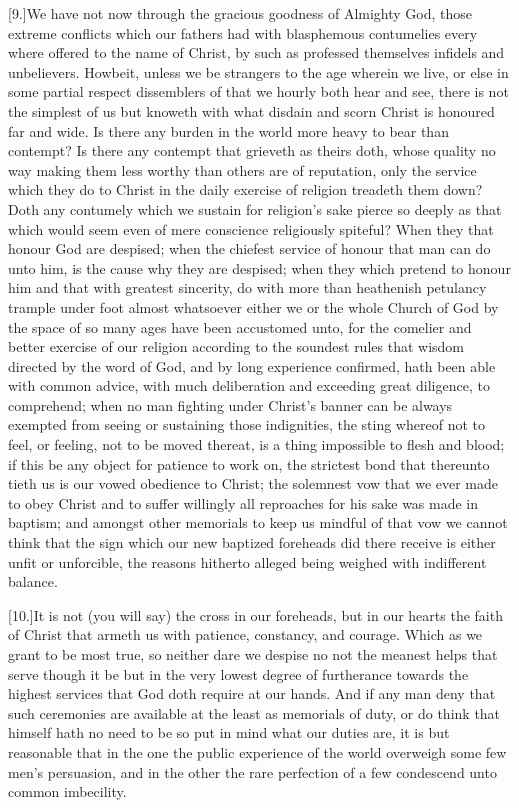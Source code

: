 [9.]We have not now through the gracious goodness of Almighty God, those extreme conflicts which our fathers had with blasphemous contumelies every where offered to the name of Christ, by such as professed themselves infidels and unbelievers. Howbeit, unless we be strangers to the age wherein we live, or else in some partial respect dissemblers  of that we hourly both hear and see, there is not the simplest of us but knoweth with what disdain and scorn Christ is honoured far and wide.
 Is there any burden in the world more heavy to bear than contempt? Is there any contempt that grieveth as theirs doth, whose quality no way making them less worthy than others are of reputation, only the service which they do to Christ in the daily exercise of religion treadeth them down? Doth any contumely which we sustain for religion’s sake pierce so deeply as that which would seem even of mere conscience religiously spiteful? When they that honour God are despised; when the chiefest service of honour that man can do unto him, is the cause why they are despised; when they which pretend to honour him and that with greatest sincerity, do with more than heathenish petulancy trample under foot almost whatsoever either we or the whole Church of God by the space of so many ages have been accustomed unto, for the comelier and better exercise of our religion according to the soundest rules that wisdom directed by the word of God, and by long experience confirmed, hath been able with common advice, with much deliberation and exceeding great diligence, to comprehend; when no man fighting under Christ’s banner can be always exempted from seeing or sustaining those indignities, the sting whereof not to feel, or feeling, not to be moved thereat, is a thing impossible to flesh and blood; if this be any object for patience to work on, the strictest bond that thereunto tieth us is our vowed obedience to Christ; the solemnest vow that we ever made to obey Christ and to suffer willingly all reproaches for his sake was made in baptism; and amongst other memorials to keep us mindful of that vow we cannot think that the sign which our new baptized foreheads did there receive is either unfit or unforcible, the reasons hitherto alleged being weighed with indifferent balance.

[10.]It is not (you will say) the cross in our foreheads, but in our hearts the faith of Christ that armeth us with patience, constancy, and courage. Which as we grant to be most true, so neither dare we despise no not the meanest helps that serve though it be but in the very lowest degree of furtherance towards the highest services that God doth require  at our hands.
 And if any man deny that such ceremonies are available at the least as memorials of duty, or do think that himself hath no need to be so put in mind what our duties are, it is but reasonable that in the one the public experience of the world overweigh some few men’s persuasion, and in the other the rare perfection of a few condescend unto common imbecility.


